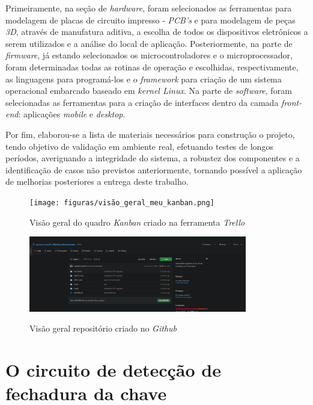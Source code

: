 Primeiramente, na seção de \textit{hardware}, foram selecionados as ferramentas para modelagem de placas de circuito impresso - \textit{PCB's} e para modelagem de peças \textit{3D}, através de manufatura aditiva, a escolha de todos os dispositivos eletrônicos a serem utilizados e a análise do local de aplicação. Posteriormente, na parte de \textit{firmware}, já estando selecionados os microcontroladores e o microprocessador, foram determinadas todas as rotinas de operação e escolhidas, respectivamente, as linguagens para programá-los e o \textit{framework} para criação de um sistema operacional embarcado baseado em \textit{kernel Linux}. Na parte de \textit{software}, foram selecionadas as ferramentas para a criação de interfaces dentro da camada \textit{front-end}: aplicações \textit{mobile} e \textit{desktop}.

Por fim, elaborou-se a lista de materiais necessários para construção o projeto, tendo objetivo de validação em ambiente real, efetuando testes de longos períodos, averiguando a integridade do sistema, a robustez dos componentes e a identificação de casos não previstos anteriormente, tornando possível a aplicação de melhorias posteriores a entrega deste trabalho.

\begin{figure}[H]
	\centering
	\caption{Visão geral do quadro \textit{Kanban} criado na ferramenta \textit{Trello}}
	\texttt{[image: figuras/visão\_geral\_meu\_kanban.png]}
	\label{fig:kanban-proj}
\end{figure}


\begin{figure}[H]
	\centering
	\caption{Visão geral repositório criado no \textit{Github}}
	\includegraphics[width=0.85\textwidth]{figuras/github.png}
	\label{fig:github}
\end{figure}

\section{O circuito de detecção de fechadura da chave} 

